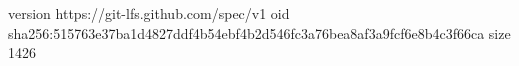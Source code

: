 version https://git-lfs.github.com/spec/v1
oid sha256:515763e37ba1d4827ddf4b54ebf4b2d546fc3a76bea8af3a9fcf6e8b4c3f66ca
size 1426
